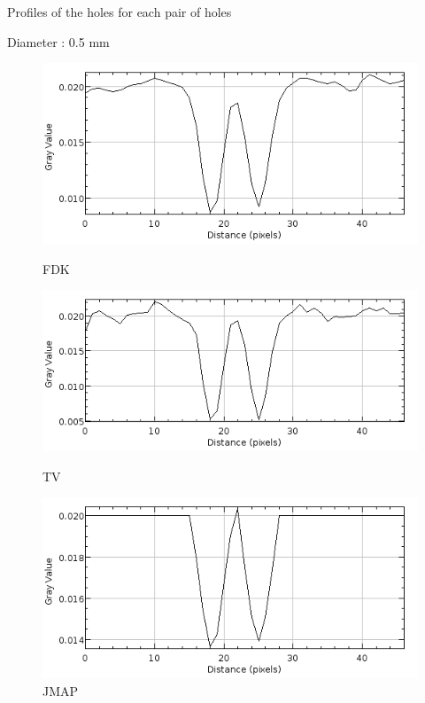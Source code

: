 \documentclass[latex]{beamer}
\begin{document}
\begin{frame}{Profiles of the holes for each pair of holes}
\begin{block}{Diameter : 0.5 mm}
\begin{figure}
\begin{minipage}[htb]{0.46\linewidth}
\centering
\includegraphics[scale=0.27]{ProfilsTrousIQICalculResolution/FDK/300proj/ProfilTrousTaille3.png}
\caption*{FDK}
\end{minipage} \hfill
\begin{minipage}[htb]{0.46\linewidth}
\centering
\includegraphics[scale=0.27]{ProfilsTrousIQICalculResolution/TV/300proj/ProfilTrousTaille3.png}
\caption*{TV}
\end{minipage} \vfill
\begin{minipage}[htb]{0.46\linewidth}
\centering
\includegraphics[scale=0.27]{ProfilsTrousIQICalculResolution/JMAPMGINonSplitGamma3K4/300proj/ProfilTrousTaille3.png}
\caption*{JMAP}
\end{minipage}
\end{figure}
\end{block}
\end{frame}
\end{document}
